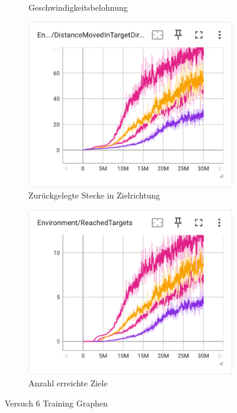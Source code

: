 \begin{figure}[H]
\begin{subfigure}{.49\textwidth}
      \caption{Geschwindigkeitsbelohnung}
      \label{fig:116_130_131_132_vel_reward}
    \end{subfigure}
    \begin{subfigure}{.49\textwidth}
      \centering  
      \includegraphics[width=\textwidth]{img/116_130_131_132_move_target_dir}
      \caption{Zurückgelegte Stecke in Zielrichtung}
      \label{fig:116_130_131_132_move_target_dir}
    \end{subfigure}
    \begin{subfigure}{.49\textwidth}
      \centering  
      \includegraphics[width=\textwidth]{img/116_130_131_132_reach_target}
      \caption{Anzahl erreichte Ziele}
      \label{fig:116_130_131_132_reach_target}
    \end{subfigure}
  \caption{Versuch 6 Training Graphen}
  \label{fig:versuch6_training}
\end{figure}

